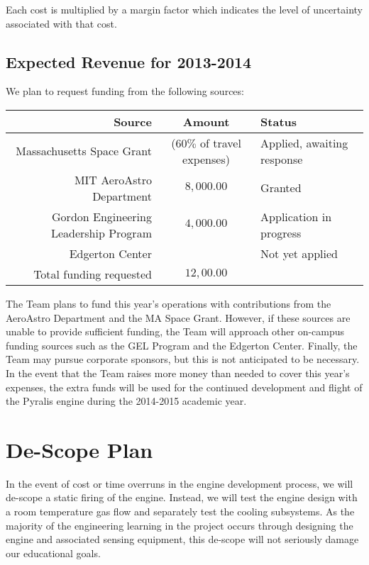 \documentclass{article}
\begin{document}
Each cost is multiplied by a margin factor which indicates the level of uncertainty associated with that cost.
\subsection*{Expected Revenue for 2013-2014}
We plan to request funding from the following sources:\\

\begin{tabular}{r|c|l}
Source & Amount & Status \\
\hline
Massachusetts Space Grant & ($60 \%$ of travel expenses) & Applied, awaiting response \\
MIT AeroAstro Department & $8,000.00$ & Granted \\
Gordon Engineering Leadership Program & $4,000.00$ & Application in progress \\
Edgerton Center &  & Not yet applied \\
\hline
Total funding requested & $12,00.00$ & \\
\end{tabular}

The Team plans to fund this year's operations with contributions from the AeroAstro Department and the MA Space Grant. However, if these sources are unable to provide sufficient funding, the Team will approach other on-campus funding sources such as the GEL Program and the Edgerton Center. Finally, the Team may pursue corporate sponsors, but this is not anticipated to be necessary. In the event that the Team raises more money than needed to cover this year's expenses, the extra funds will be used for the continued development and flight of the Pyralis engine during the 2014-2015 academic year. 
\section*{De-Scope Plan}
In the event of cost or time overruns in the engine development process, we will de-scope a static firing of the engine. Instead, we will test the engine design with a room temperature gas flow and separately test the cooling subsystems. As the majority of the engineering learning in the project occurs through designing the engine and associated sensing equipment, this de-scope will not seriously damage our educational goals. 
\end{document}
